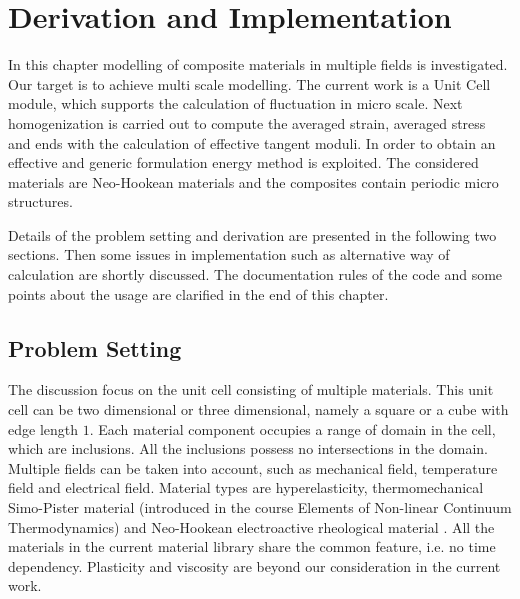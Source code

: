 %
%
%
%
%

\chapter{Derivation and Implementation}
In this chapter modelling of composite materials in multiple fields is investigated. Our target is to achieve multi scale modelling. The current work is a Unit Cell module, which supports the calculation of fluctuation in micro scale. Next homogenization is carried out to compute the averaged strain, averaged stress and ends with the calculation of effective tangent moduli. In order to obtain an effective and generic formulation energy method is exploited. The considered materials are Neo-Hookean materials and the composites contain periodic micro structures.

Details of the problem setting and derivation are presented in the following two sections. Then some issues in implementation such as alternative way of calculation are shortly discussed. The documentation rules of the code and some points about the usage are clarified in the end of this chapter.

\section{Problem Setting}
The discussion focus on the unit cell consisting of multiple materials. This unit cell can be two dimensional or three dimensional, namely a square or a cube with edge length $1$. Each material component occupies a range of domain in the cell, which are inclusions. All the inclusions possess no intersections in the domain. Multiple fields can be taken into account, such as mechanical field, temperature field and electrical field. Material types are hyperelasticity, thermomechanical Simo-Pister material (introduced in the course Elements of Non-linear Continuum Thermodynamics) and Neo-Hookean electroactive rheological material \citep{SchKei:2012:tho}. All the materials in the current material library share the common feature, i.e. no time dependency. Plasticity and viscosity are beyond our consideration in the current work.

